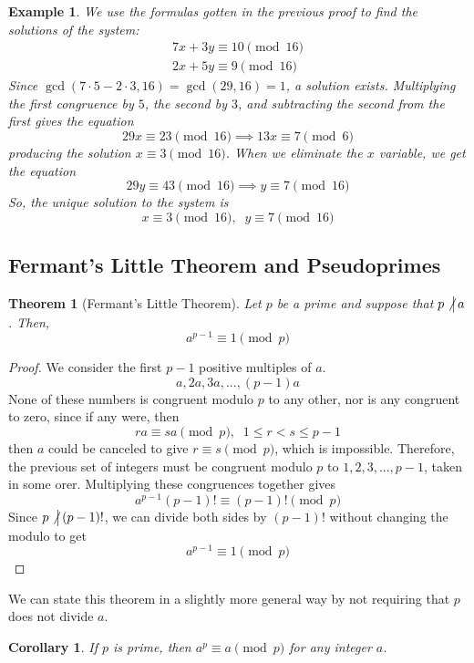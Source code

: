 \documentclass{article}
\newtheorem{theorem}{Theorem}[section]
\newtheorem{example}{Example}[section]
\newtheorem{corollary}{Corollary}[theorem]
\theoremstyle{remark}
\theoremstyle{definition}
\begin{document}
\begin{example}
We use the formulas gotten in the previous proof to find the solutions of the system: 
\begin{align*}
    7x + 3y \equiv 10 \pmod{16} \\
    2x + 5y \equiv 9 \pmod{16} 
\end{align*}
Since $\gcd(7\cdot 5 - 2 \cdot 3, 16) = \gcd(29, 16) = 1$, a solution exists. Multiplying the first congruence by $5$, the second by $3$, and subtracting the second from the first gives the equation
\[29 x \equiv 23 \pmod{16} \implies 13 x \equiv 7 \pmod{6}\]
producing the solution $x \equiv 3 \pmod{16}$. When we eliminate the $x$ variable, we get the equation 
\[29 y \equiv 43 \pmod{16} \implies y \equiv 7 \pmod{16}\]
So, the unique solution to the system is
\[x \equiv 3 \pmod{16}, \;\; y \equiv 7 \pmod{16}\]
\end{example}

\subsection{Fermant's Little Theorem and Pseudoprimes}

\begin{theorem}[Fermant's Little Theorem]
Let $p$ be a prime and suppose that $p \not\big| \,a$. Then, 
\[a^{p-1} \equiv 1 \pmod{p}\]
\end{theorem}
\begin{proof}
We consider the first $p-1$ positive multiples of $a$. 
\[a, 2a, 3a, ..., (p-1) a\]
None of these numbers is congruent modulo $p$ to any other, nor is any congruent to zero, since if any were, then 
\[ra \equiv sa \pmod{p}, \;\; 1 \leq r < s \leq p-1\]
then $a$ could be canceled to give $r \equiv s \pmod{p}$, which is impossible. Therefore, the previous set of integers must be congruent modulo $p$ to $1, 2, 3, ..., p-1$, taken in some orer. Multiplying these congruences together gives 
\[a^{p-1} (p-1)! \equiv (p-1)! \pmod{p}\]
Since $p \not\big| \, (p-1)!$, we can divide both sides by $(p-1)!$ without changing the modulo to get
\[a^{p-1} \equiv 1 \pmod{p}\]
\end{proof}

We can state this theorem in a slightly more general way by not requiring that $p$ does not divide $a$. 

\begin{corollary}
If $p$ is prime, then $a^p \equiv a \pmod{p}$ for any integer $a$. 
\end{corollary}
\end{document}
